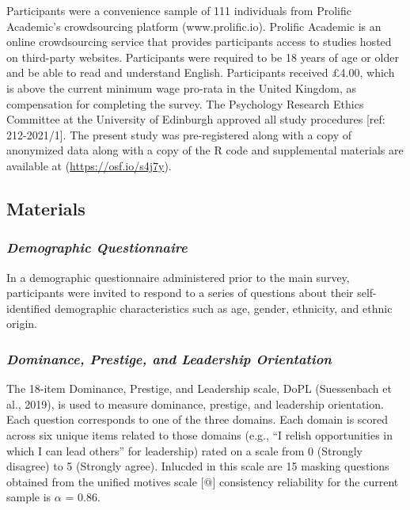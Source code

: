 \documentclass[
  donotrepeattitle,doc, 12pt, a4paper,floatsintext]{apa7}
\begin{document}
Participants were a convenience sample of 111 individuals from Prolific Academic's crowdsourcing platform (www.prolific.io). Prolific Academic is an online crowdsourcing service that provides participants access to studies hosted on third-party websites. Participants were required to be 18 years of age or older and be able to read and understand English. Participants received £4.00, which is above the current minimum wage pro-rata in the United Kingdom, as compensation for completing the survey. The Psychology Research Ethics Committee at the University of Edinburgh approved all study procedures {[}ref: 212-2021/1{]}. The present study was pre-registered along with a copy of anonymized data along with a copy of the R code and supplemental materials are available at (\url{https://osf.io/s4j7y}).

\hypertarget{materials}{%
\subsection{Materials}\label{materials}}

\hypertarget{demographic-questionnaire}{%
\subsubsection{\texorpdfstring{\emph{Demographic Questionnaire}}{Demographic Questionnaire}}\label{demographic-questionnaire}}

In a demographic questionnaire administered prior to the main survey, participants were invited to respond to a series of questions about their self-identified demographic characteristics such as age, gender, ethnicity, and ethnic origin.

\hypertarget{dominance-prestige-and-leadership-orientation-1}{%
\subsubsection{\texorpdfstring{\emph{Dominance, Prestige, and Leadership Orientation}}{Dominance, Prestige, and Leadership Orientation}}\label{dominance-prestige-and-leadership-orientation-1}}

The 18-item Dominance, Prestige, and Leadership scale, DoPL (Suessenbach et al., 2019), is used to measure dominance, prestige, and leadership orientation. Each question corresponds to one of the three domains. Each domain is scored across six unique items related to those domains (e.g., ``I relish opportunities in which I can lead others'' for leadership) rated on a scale from 0 (Strongly disagree) to 5 (Strongly agree). Inlucded in this scale are 15 masking questions obtained from the unified motives scale {[}@{]} consistency reliability for the current sample is \(\alpha\) = 0.86.
\end{document}
